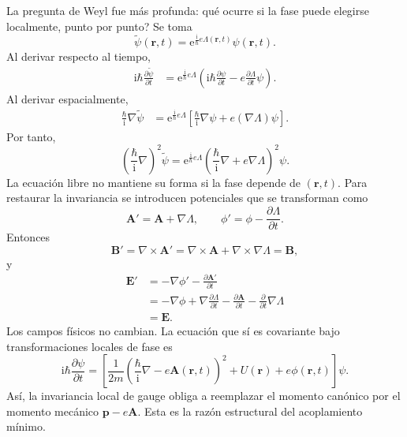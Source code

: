 \documentclass[11pt]{article}
\newcommand{\ii}{\mathrm{i}}
\newcommand{\ee}{\mathrm{e}}
\newcommand{\vb}[1]{\mathbf{#1}}
\begin{document}
La pregunta de Weyl fue m\'as profunda: \textquestiondown qu\'e ocurre si la
fase puede elegirse localmente, punto por punto? Se toma
\begin{equation}
  \tilde\psi(\vb r,t)
  =
  \ee^{\frac{\ii}{\hbar}e\Lambda(\vb r,t)}
  \psi(\vb r,t).
\end{equation}
Al derivar respecto al tiempo,
\begin{align}
  \ii\hbar\frac{\partial\tilde\psi}{\partial t}
  &=
  \ee^{\frac{\ii}{\hbar}e\Lambda}
  \left(
    \ii\hbar\frac{\partial\psi}{\partial t}
    -
    e\frac{\partial\Lambda}{\partial t}\psi
  \right).
\end{align}
Al derivar espacialmente,
\begin{align}
  \frac{\hbar}{\ii}\nabla\tilde\psi
  &=
  \ee^{\frac{\ii}{\hbar}e\Lambda}
  \left[
    \frac{\hbar}{\ii}\nabla\psi
    +
    e(\nabla\Lambda)\psi
  \right].
\end{align}
Por tanto,
\begin{equation}
  \left(
    \frac{\hbar}{\ii}\nabla
  \right)^2\tilde\psi
  =
  \ee^{\frac{\ii}{\hbar}e\Lambda}
  \left(
    \frac{\hbar}{\ii}\nabla+e\nabla\Lambda
  \right)^2\psi.
\end{equation}
La ecuaci\'on libre no mantiene su forma si la fase depende de
\((\vb r,t)\). Para restaurar la invariancia se introducen potenciales que se
transforman como
\begin{equation}
  \vb A'
  =
  \vb A+\nabla\Lambda,
  \qquad
  \phi'
  =
  \phi-\frac{\partial\Lambda}{\partial t}.
\end{equation}
Entonces
\begin{equation}
  \vb B'
  =
  \nabla\times\vb A'
  =
  \nabla\times\vb A
  +
  \nabla\times\nabla\Lambda
  =
  \vb B,
\end{equation}
y
\begin{align}
  \vb E'
  &=
  -\nabla\phi'
  -
  \frac{\partial\vb A'}{\partial t}                                           \\
  &=
  -\nabla\phi
  +
  \nabla\frac{\partial\Lambda}{\partial t}
  -
  \frac{\partial\vb A}{\partial t}
  -
  \frac{\partial}{\partial t}\nabla\Lambda                                    \\
  &=
  \vb E.
\end{align}
Los campos f\'isicos no cambian. La ecuaci\'on que s\'i es covariante bajo
transformaciones locales de fase es
\begin{equation}
  \ii\hbar\frac{\partial\psi}{\partial t}
  =
  \left[
    \frac{1}{2m}
    \left(
      \frac{\hbar}{\ii}\nabla-e\vb A(\vb r,t)
    \right)^2
    +
    U(\vb r)
    +
    e\phi(\vb r,t)
  \right]\psi .
\end{equation}
As\'i, la invariancia local de gauge obliga a reemplazar el momento can\'onico
por el momento mec\'anico \(\vb p-e\vb A\). Esta es la raz\'on estructural del
acoplamiento m\'inimo.
\end{document}
